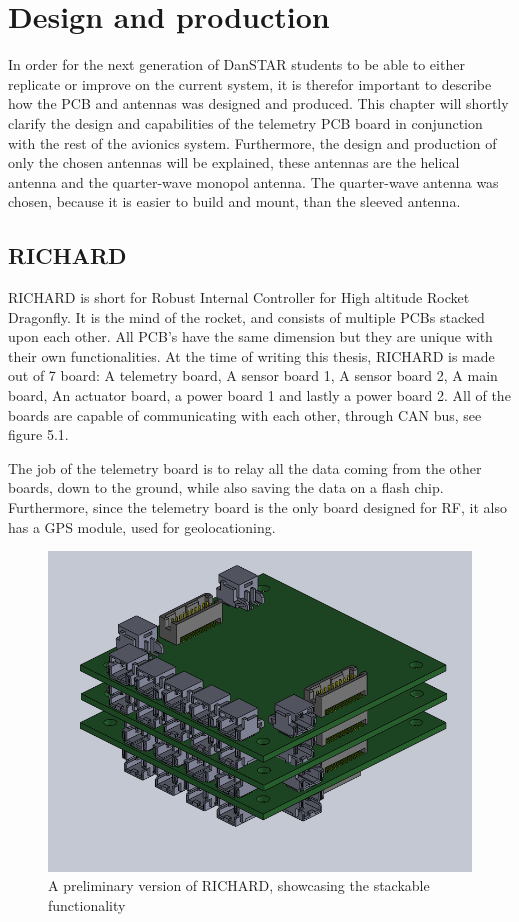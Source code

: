 \chapter{Design and production}
In order for the next generation of DanSTAR students to be able to either replicate or improve on the current system, it is therefor important to describe how the PCB and antennas was designed and produced. This chapter will shortly clarify the design and capabilities of the telemetry PCB board in conjunction with the rest of the avionics system. Furthermore, the design and production of only the chosen antennas will be explained, these antennas are the helical antenna and the quarter-wave monopol antenna. The quarter-wave antenna was chosen, because it is easier to build and mount, than the sleeved antenna.  

\section{RICHARD}
RICHARD is short for Robust Internal Controller for High altitude Rocket Dragonfly. It is the mind of the rocket, and consists of multiple PCBs stacked upon each other. All PCB's have the same dimension but they are unique with their own functionalities. At the time of writing this thesis, RICHARD is made out of 7 board: A telemetry board, A sensor board 1, A sensor board 2, A main board, An actuator board, a power board 1 and lastly a power board 2. All of the boards are capable of communicating with each other, through CAN bus\cite{CANBus}, see figure 5.1. 

The job of the telemetry board is to relay all the data coming from the other boards, down to the ground, while also saving the data on a flash chip. Furthermore, since the telemetry board is the only board designed for RF, it also has a GPS module, used for geolocationing.

\begin{figure}[h!]
\centering
\includegraphics[scale=0.48]{figures/RICHARD.png}
\caption{A preliminary version of RICHARD, showcasing the stackable functionality}
\end{figure}

